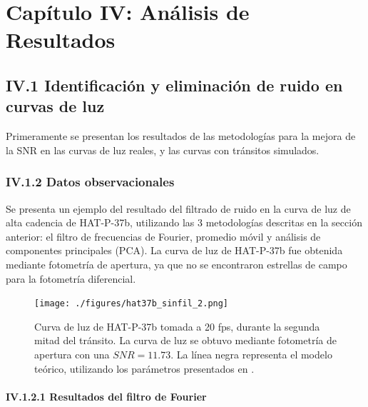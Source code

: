 \chapter*{\textbf{Capítulo IV: Análisis de Resultados}}
\setcounter{chapter}{4}
\setcounter{equation}{0}
\setcounter{figure}{0}
\setcounter{table}{0}

\section*{IV.1 Identificación y eliminación de ruido en curvas de luz}

Primeramente se presentan los resultados de las metodologías para la mejora de la SNR en las curvas de luz reales, y las curvas con tránsitos simulados.

\subsection*{IV.1.2 Datos observacionales}

Se presenta un ejemplo del resultado del filtrado de ruido en la curva de luz de alta cadencia de HAT-P-37b, utilizando las 3 metodologías descritas en la sección anterior: el filtro de frecuencias de Fourier, promedio móvil y análisis de componentes principales (PCA). La curva de luz de HAT-P-37b fue obtenida mediante fotometría de apertura, ya que no se encontraron estrellas de campo para la fotometría diferencial.

\begin{figure}[h!]
	\centering
	  \texttt{[image: ./figures/hat37b\_sinfil\_2.png]}
	 \caption{Curva de luz de HAT-P-37b tomada a 20 fps, durante la segunda mitad del tránsito. La curva de luz se obtuvo mediante fotometría de apertura con una $SNR=11.73$. La línea negra representa el modelo teórico, utilizando los parámetros presentados en \cite{bakos2012hat}.}
	  \label{fig_4_1_transito_hat37b}
  \end{figure}


\subsubsection*{IV.1.2.1 Resultados del filtro de Fourier}

